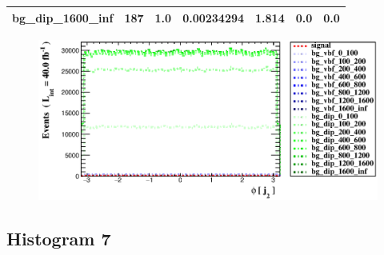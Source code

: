 \documentclass[a4paper, 10pt]{article}
\begin{document}
\begin{table}[H]
\begin{center}
\begin{tabular}{|m{23.0mm}|m{23.0mm}|m{18.0mm}|m{19.0mm}|m{19.0mm}|m{19.0mm}|m{19.0mm}|}
      \hline
      {\cellcolor{white}         bg\_dip\_1600\_inf}& {\cellcolor{white}         187}& {\cellcolor{white}         1.0}& {\cellcolor{white}         0.00234294}& {\cellcolor{white}         1.814}& {\cellcolor{green}         0.0}& {\cellcolor{green}         0.0}\\
\hline
    \end{tabular}
  \end{center}
\end{table}

\begin{figure}[H]
  \begin{center}
    \includegraphics[scale=0.45]{selection_5.eps}\\
\caption{   }
  \end{center}
\end{figure}
      \newpage
\subsection{ Histogram 7}
\end{document}
